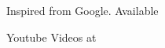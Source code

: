 \documentclass{article}
\begin{document}
    

    \begin{thebibliography}{9}
    Inspired from Google. Available \href{www.google.com}{\color{blue}{here}}
     
    Youtube Videos at \href{https://www.youtube.com/watch?v=dQw4w9WgXcQ}{\color{blue}{this link}}

    \end{thebibliography}


    
    
    
\end{document}
